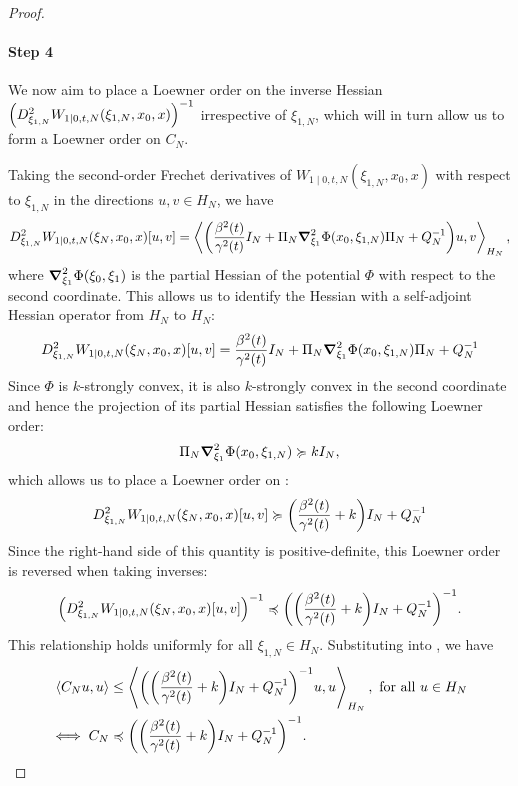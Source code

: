 \begin{proof}
  \paragraph{Step 4}
  We now aim to place a Loewner order on the inverse Hessian \(\qty(D^{2}_{\xi_{1, N}}W_{1 \mid 0, t, N}(\xi_{1, N}, x_{0}, x))^{-1}\) irrespective of \(\xi_{1, N}\), which will in turn allow us to form a Loewner order on \(C_{N}\).

  Taking the second-order Frechet derivatives of \(W_{1 \mid 0, t,N}(\xi_{1, N}, x_{0}, x)\) with respect to \(\xi_{1, N}\) in the directions \(u, v \in H_{N}\), we have
  \begin{align*}
    D^{2}_{\xi_{1, N}}W_{1 \mid 0, t, N}(\xi_{N}, x_{0}, x)[u, v] = \ev{\qty(\frac{\beta^{2}(t)}{\gamma^{2}(t)} I_{N} + \Pi_{N}\grad_{\xi_{1}}^{2}\Phi(x_{0}, \xi_{1, N})\Pi_{N} + Q_{N}^{-1})u, v}_{H_{N}},
  \end{align*}
  where \(\grad_{\xi_{1}}^{2} \Phi(\xi_{0}, \xi_{1})\) is the partial Hessian of the potential \(\Phi\) with respect to the second coordinate. This allows us to identify the Hessian with a self-adjoint Hessian operator from \(H_{N}\) to \(H_{N}\):
  \begin{equation}
    D^{2}_{\xi_{1, N}}W_{1 \mid 0, t, N}(\xi_{N}, x_{0}, x)[u, v] = \frac{\beta^{2}(t)}{\gamma^{2}(t)} I_{N} + \Pi_{N}\grad_{\xi_{1}}^{2}\Phi(x_{0}, \xi_{1, N})\Pi_{N} + Q_{N}^{-1}\label{eqn:hess}
  \end{equation}
  Since \(\Phi\) is \(k\)-strongly convex, it is also \(k\)-strongly convex in the second coordinate and hence the projection of its partial Hessian satisfies the following Loewner order:
  \[
    \Pi_{N} \grad^{2}_{\xi_{1}} \Phi(x_{0}, \xi_{1, N}) \succcurlyeq k I_{N},
  \]
  which allows us to place a Loewner order on :
  \[
    D^{2}_{\xi_{1, N}}W_{1 \mid 0, t, N}(\xi_{N}, x_{0}, x)[u, v] \succcurlyeq \qty(\frac{\beta^{2}(t)}{\gamma^{2}(t)} + k) I_{N} + Q_{N}^{-1}
  \]
  Since the right-hand side of this quantity is positive-definite, this Loewner order is reversed when taking inverses:
  \[
    \qty(D^{2}_{\xi_{1, N}}W_{1 \mid 0, t, N}(\xi_{N}, x_{0}, x)[u, v])^{-1} \preccurlyeq \qty(\qty(\frac{\beta^{2}(t)}{\gamma^{2}(t)} + k) I_{N} + Q_{N}^{-1})^{-1}.
  \]
  This relationship holds uniformly for all \(\xi_{1, N} \in H_{N}\). Substituting into , we have
  \begin{align*}
    \ev{C_{N}u, u} &\leq \ev{\qty(\qty(\frac{\beta^{2}(t)}{\gamma^{2}(t)} + k) I_{N} + Q_{N}^{-1})^{-1}u, u}_{H_{N}}, \text{ for all } u \in H_{N}\\
    \iff C_{N} &\preccurlyeq \qty(\qty(\frac{\beta^{2}(t)}{\gamma^{2}(t)} + k) I_{N} + Q_{N}^{-1})^{-1}.
  \end{align*}

\end{proof}
